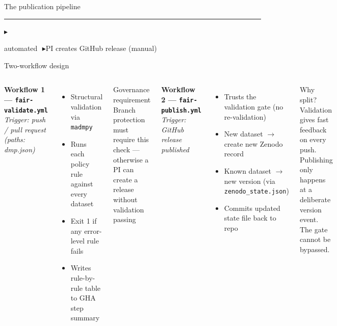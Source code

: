 \documentclass[aspectratio=169]{beamer}
\begin{document}
\begin{frame}{The publication pipeline}
\begin{center}

  \smallskip
  {\tiny
   \textcolor{cristeal}{\rule[0.5ex]{0.5cm}{0.6pt}$\blacktriangleright$}\;automated\qquad
   \textcolor{crisgreen}{\textendash\,\textendash\,$\blacktriangleright$}\;PI creates GitHub release (manual)}
  \end{center}
\end{frame}

\begin{frame}[shrink=7]{Two-workflow design}
  \begin{columns}[T]
      \textbf{Workflow 1 --- \texttt{fair-validate.yml}}\\
      \textit{Trigger: push / pull request (paths: dmp.json)}
      \begin{itemize}\setlength\itemsep{2pt}
        \item Structural validation via \texttt{madmpy}
        \item Runs each policy rule against every dataset
        \item Exit 1 if any error-level rule fails
        \item Writes rule-by-rule table to GHA step summary
      \end{itemize}
      \vspace{0.15cm}
      \begin{alertblock}{Governance requirement}
        \footnotesize Branch protection must require this check ---
        otherwise a PI can create a release without validation passing
      \end{alertblock}

      \textbf{Workflow 2 --- \texttt{fair-publish.yml}}\\
      \textit{Trigger: GitHub release published}
      \begin{itemize}\setlength\itemsep{2pt}
        \item Trusts the validation gate (no re-validation)
        \item New dataset $\to$ create new Zenodo record
        \item Known dataset $\to$ new version (via \texttt{zenodo\_state.json})
        \item Commits updated state file back to repo
      \end{itemize}
      \vspace{0.1cm}
      \begin{block}{Why split?}
        \footnotesize Validation gives fast feedback on every push.
        Publishing only happens at a deliberate version event.
        The gate cannot be bypassed.
      \end{block}
  \end{columns}
\end{frame}
\end{document}
